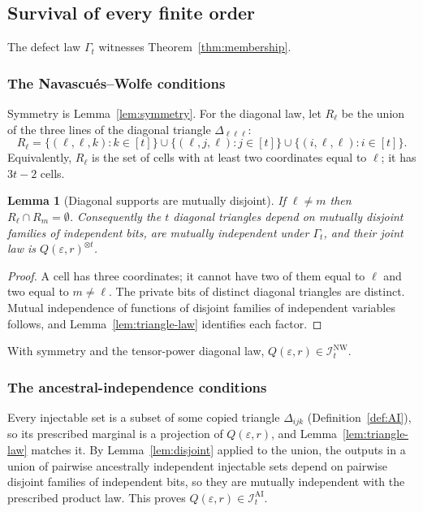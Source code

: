 \documentclass[11pt]{article}
\theoremstyle{plain}
\newtheorem{lemma}[theorem]{Lemma}
\theoremstyle{definition}
\newcommand{\INW}{\mathcal I^{\mathrm{NW}}}
\newcommand{\IAI}{\mathcal I^{\mathrm{AI}}}
\newcommand{\eps}{\varepsilon}
\begin{document}
\subsection{Survival of every finite order}\label{sec:survival}

The defect law $\Gamma_t$ witnesses Theorem~\ref{thm:membership}.

\subsubsection{The Navascués--Wolfe conditions}
Symmetry is Lemma~\ref{lem:symmetry}. For the diagonal law, let $R_\ell$ be the union of the three lines of the diagonal triangle $\Delta_{\ell\ell\ell}$:
\begin{equation}\label{eq:Rl}
R_\ell=\{(\ell,\ell,k):k\in[t]\}\cup\{(\ell,j,\ell):j\in[t]\}\cup\{(i,\ell,\ell):i\in[t]\}.
\end{equation}
Equivalently, $R_\ell$ is the set of cells with at least two coordinates equal to $\ell$; it has $3t-2$ cells.

\begin{lemma}[Diagonal supports are mutually disjoint]\label{lem:diag}
If $\ell\ne m$ then $R_\ell\cap R_m=\emptyset$. Consequently the $t$ diagonal triangles depend on mutually disjoint families of independent bits, are mutually independent under $\Gamma_t$, and their joint law is $Q(\eps,r)^{\otimes t}$.
\end{lemma}
\begin{proof}
A cell has three coordinates; it cannot have two of them equal to $\ell$ and two equal to $m\ne\ell$. The private bits of distinct diagonal triangles are distinct. Mutual independence of functions of disjoint families of independent variables follows, and Lemma~\ref{lem:triangle-law} identifies each factor.
\end{proof}

With symmetry and the tensor-power diagonal law, $Q(\eps,r)\in\INW_t$.

\subsubsection{The ancestral-independence conditions}
Every injectable set is a subset of some copied triangle $\Delta_{ijk}$ (Definition~\ref{def:AI}), so its prescribed marginal is a projection of $Q(\eps,r)$, and Lemma~\ref{lem:triangle-law} matches it. By Lemma~\ref{lem:disjoint} applied to the union, the outputs in a union of pairwise ancestrally independent injectable sets depend on pairwise disjoint families of independent bits, so they are mutually independent with the prescribed product law. This proves $Q(\eps,r)\in\IAI_t$.
\end{document}
